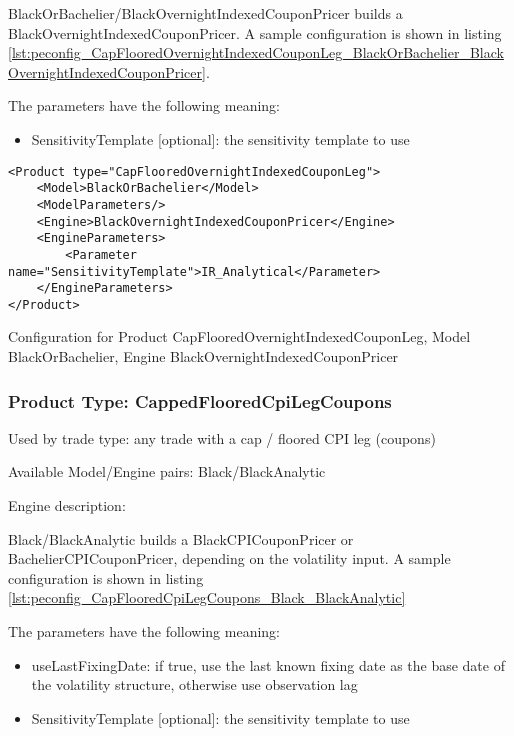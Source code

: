 BlackOrBachelier/BlackOvernightIndexedCouponPricer builds a BlackOvernightIndexedCouponPricer. A sample configuration is
shown in listing \ref{lst:peconfig_CapFlooredOvernightIndexedCouponLeg_BlackOrBachelier_BlackOvernightIndexedCouponPricer}.

The parameters have the following meaning:

\begin{itemize}
\item SensitivityTemplate [optional]: the sensitivity template to use 
\end{itemize}

\begin{longlisting}
\begin{verbatim}
<Product type="CapFlooredOvernightIndexedCouponLeg">
    <Model>BlackOrBachelier</Model>
    <ModelParameters/>
    <Engine>BlackOvernightIndexedCouponPricer</Engine>
    <EngineParameters>
        <Parameter name="SensitivityTemplate">IR_Analytical</Parameter>
    </EngineParameters>
</Product>
\end{verbatim}
\caption{Configuration for Product CapFlooredOvernightIndexedCouponLeg, Model BlackOrBachelier, Engine BlackOvernightIndexedCouponPricer}
\label{lst:peconfig_CapFlooredOvernightIndexedCouponLeg_BlackOrBachelier_BlackOvernightIndexedCouponPricer}
\end{longlisting}

\subsubsection{Product Type: CappedFlooredCpiLegCoupons}

Used by trade type: any trade with a cap / floored CPI leg (coupons)

Available Model/Engine pairs: Black/BlackAnalytic

Engine description:

Black/BlackAnalytic builds a BlackCPICouponPricer or BachelierCPICouponPricer, depending on the volatility input. A sample configuration is
shown in listing \ref{lst:peconfig_CapFlooredCpiLegCoupons_Black_BlackAnalytic}

The parameters have the following meaning:

\begin{itemize}
\item useLastFixingDate: if true, use the last known fixing date as the base date of the volatility structure, otherwise
  use observation lag        
\item SensitivityTemplate [optional]: the sensitivity template to use 
\end{itemize}

